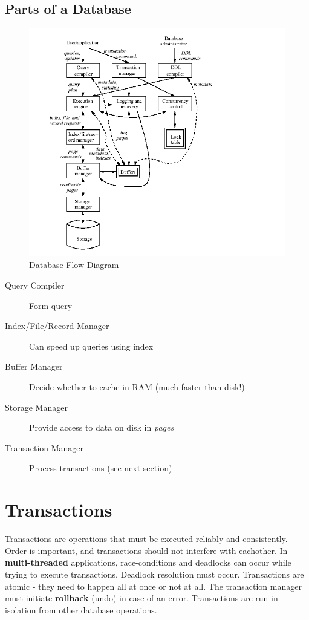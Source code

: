 \documentclass{article}
\begin{document}
\subsection{Parts of a Database}

\begin{figure}[H]
    \centering
    \includegraphics[scale=0.5]{dbms}
    \caption{Database Flow Diagram}
\end{figure}
\begin{description}
    \item[Query Compiler] {Form query}
    \item[Index/File/Record Manager] {Can speed up queries using index}
    \item[Buffer Manager] {Decide whether to cache in RAM (much faster than disk!)}
    \item[Storage Manager] {Provide access to data on disk in \emph{pages}}
    \item[Transaction Manager] {Process transactions (see next section)}
\end{description}

\section{Transactions}
Transactions are operations that must be executed reliably and consistently.
Order is important, and transactions should not interfere with eachother.
In \textbf{multi-threaded} applications, race-conditions and deadlocks can occur
while trying to execute transactions. Deadlock resolution must occur.
Transactions are atomic - they need to happen all at once or not at all.
The transaction manager must initiate \textbf{rollback} (undo) in case of an
error. Transactions are run in isolation from other database operations.
\end{document}

